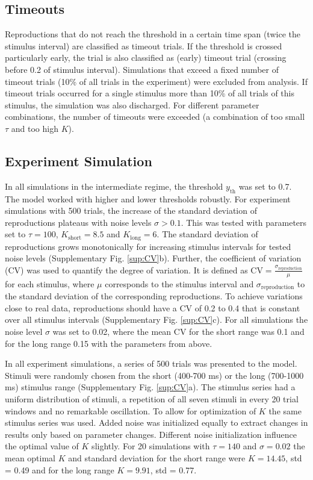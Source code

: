 \documentclass[10pt]{article}
\begin{document}
\subsection*{Timeouts}
Reproductions that do not reach the threshold in a certain time span (twice the stimulus interval) are classified as timeout trials. 
If the threshold is crossed particularly early, the trial is also classified as (early) timeout trial (crossing before 0.2 of stimulus interval).
Simulations that exceed a fixed number of timeout trials (10\% of all trials in the experiment) were excluded from analysis.
If timeout trials occurred for a single stimulus more than 10\% of all trials of this stimulus, the simulation was also discharged.
For different parameter combinations, the number of timeouts were exceeded (a combination of too small $\tau$ and too high $K$).


\subsection*{Experiment Simulation}
In all simulations in the intermediate regime, the threshold $y_\text{th}$ was set to 0.7. The model worked with higher and lower thresholds robustly.  
For experiment simulations with 500 trials, the increase of the standard deviation of reproductions plateaus with noise levels $\sigma > 0.1$. This was tested with parameters set to $\tau=100$, $K_\text{short}=8.5$ and $K_\text{long}=6$.
The standard deviation of reproductions grows monotonically for increasing stimulus intervals for tested noise levels (Supplementary Fig. \ref{sup:CV}b).
Further, the coefficient of variation (CV) was used to quantify the degree of variation. It is defined as $\text{CV}=\frac{\sigma_\text{reproduction}}{\mu}$ for each stimulus, where $\mu$ corresponds to the stimulus interval and $\sigma_\text{reproduction}$ to the standard deviation of the corresponding reproductions. 
To achieve variations close to real data, reproductions should have a CV of 0.2 to 0.4 that is constant over all stimulus intervals (Supplementary Fig. \ref{sup:CV}c).
For all simulations the noise level $\sigma$ was set to 0.02, where the mean CV for the short range was 0.1 and for the long range 0.15 with the parameters from above.

In all experiment simulations, a series of 500 trials was presented to the model.
Stimuli were randomly chosen from the short (400-700 ms) or the long (700-1000 ms) stimulus range (Supplementary Fig. \ref{sup:CV}a).
The stimulus series had a uniform distribution of stimuli, a repetition of all seven stimuli in every 20 trial windows and no remarkable oscillation.
To allow for optimization of $K$ the same stimulus series was used. Added noise was initialized equally to extract changes in results only based on parameter changes.
Different noise initialization influence the optimal value of $K$ slightly. For 20 simulations with $\tau=140$ and $\sigma=0.02$ the mean optimal $K$ and standard deviation for the short range were $K = 14.45$, std = 0.49 and for the long range $K = 9.91$, std = 0.77. 
\end{document}
